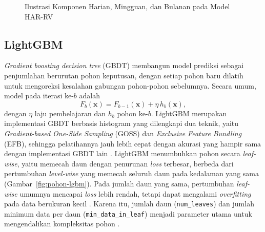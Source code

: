 \begin{figure}[htbp]
  \centering
  \caption{Ilustrasi Komponen Harian, Mingguan, dan Bulanan pada Model HAR-RV}
  \label{fig:har-komponen}
\end{figure}

\subsection{LightGBM}
\textit{Gradient boosting decision tree} (GBDT) membangun model prediksi
sebagai penjumlahan berurutan pohon keputusan, dengan setiap pohon baru dilatih
untuk mengoreksi kesalahan gabungan pohon-pohon sebelumnya. Secara umum, model
pada iterasi ke-$b$ adalah
\begin{equation}
  F_b(\mathbf{x}) = F_{b-1}(\mathbf{x}) + \eta\, h_b(\mathbf{x}),
  \label{eq:gbdt}
\end{equation}
dengan $\eta$ laju pembelajaran dan $h_b$ pohon ke-$b$. LightGBM merupakan
implementasi GBDT berbasis histogram yang dilengkapi dua teknik, yaitu
\textit{Gradient-based One-Side Sampling} (GOSS) dan \textit{Exclusive Feature
Bundling} (EFB), sehingga pelatihannya jauh lebih cepat dengan akurasi yang
hampir sama dengan implementasi GBDT lain \cite{ke2017}. LightGBM menumbuhkan
pohon secara \textit{leaf-wise}, yaitu memecah daun dengan penurunan
\textit{loss} terbesar, berbeda dari pertumbuhan \textit{level-wise} yang
memecah seluruh daun pada kedalaman yang sama (Gambar~\ref{fig:pohon-lgbm}).
Pada jumlah daun yang sama, pertumbuhan \textit{leaf-wise} umumnya mencapai
\textit{loss} lebih rendah, tetapi dapat mengalami \textit{overfitting} pada
data berukuran kecil \cite{lightgbmfeatures}. Karena itu, jumlah daun
(\texttt{num\_leaves}) dan jumlah minimum data per daun
(\texttt{min\_data\_in\_leaf}) menjadi parameter utama untuk mengendalikan
kompleksitas pohon \cite{lightgbmtuning}.

